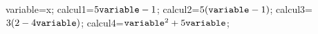 \documentclass[exercice]{thedocument}%
\begin{document}
%
    \>variable=x;%
    \>calcul1=$5{\<variable;}-1$;%
    \>calcul2=$5({\<variable;}-1)$;%
    \>calcul3=$3(2-4{\<variable;})$;%
    \>calcul4=${\<variable;}^2+5{\<variable;}$;%
\end{document}
